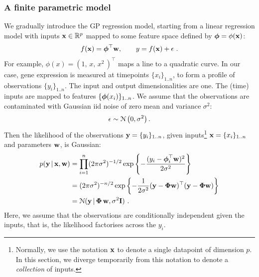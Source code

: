       \subsubsection{A finite parametric model}
	We gradually introduce the GP regression model, starting from a linear regression
	model with inputs $\mathbf{x} \in \mathbb{R}^p$ mapped to some feature space defined by $\boldsymbol{\phi} = \phi(\mathbf{x})$:
	\begin{equation} \label{equ:chap2_LRmodel}
	  f(\mathbf{x}) = \boldsymbol{\phi}^\top \mathbf{w}, \qquad y = f(\mathbf{x}) + \epsilon ~.
	\end{equation}
	For example, $\phi(x) = (1,\,x,\,x^2 \,)^\top$ maps a line to a quadratic curve.
	In our case, gene expression is measured at timepoints $\{x_{i}\}_{1..n}$,
	to form a profile of observations $\{y_i\}_{1..n}$. The input and output dimensionalities are one.
	The (time) inputs are mapped to features $\{ \boldsymbol{\phi}(x_i) \}_{1..n}$.
	We assume that the observations are contaminated with Gaussian iid noise of
	zero mean and variance $\sigma^2$:
	\begin{equation} \label{equ:chap2_noise} 
	  \epsilon \sim \mathcal{N} \left( 0, \sigma^2 \right).
	\end{equation}
	Then the likelihood of the observations $\mathbf{y}=\{y_i\}_{1..n}$, given
	inputs\footnote{Normally, we use the notation $\mathbf{x}$ to denote a single datapoint of dimension $p$.
	In this section, we diverge temporarily from this notation to denote a \textit{collection} of inputs.}
	$\mathbf{x}=\{x_i\}_{1..n}$ and parameters $\mathbf{w}$, is Gaussian:
	\begin{equation*} \label{equ:chap2_data_likelihood}
	  \begin{split}
	    p(\mathbf{y}\,|\,\mathbf{x},\mathbf{w}) &=
	    \prod^n_{i=1} (2\pi\sigma^2)^{-1/2} \exp\left\{-\frac{(y_i - \boldsymbol{\phi}^\top_i \mathbf{w})^2}{2\sigma^2}\right\} \\
	    &= (2\pi\sigma^2)^{-n/2} \exp\left\{-\frac{1}{2\sigma^2}(\mathbf{y} - \mathbf{\Phi} \mathbf{w})^\top(\mathbf{y} -\mathbf{\Phi} \mathbf{w}) \right\} \\
	    &= \mathcal{N}(\mathbf{y} \,|\, \mathbf{\Phi} \, \mathbf{w}, \sigma^2 \mathbf{I}) ~.
	  \end{split}
	\end{equation*}
	Here, we assume that the observations are conditionally independent given the inputs, that is, the likelihood
	factorises across the $y_i$.

